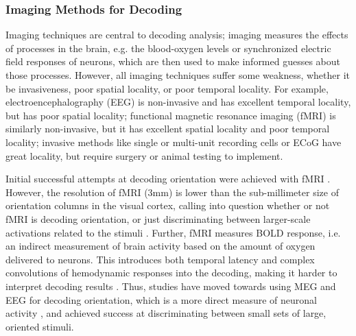 \documentclass[../main.tex]{subfiles}
\begin{document}
\subsubsection{Imaging Methods for Decoding}
Imaging techniques are central to decoding analysis; imaging measures the effects of processes in the brain, e.g. the blood-oxygen levels or synchronized electric field responses of neurons, which are then used to make informed guesses about those processes. However, all imaging techniques suffer some weakness, whether it be invasiveness, poor spatial locality, or poor temporal locality. For example, electroencephalography (EEG) is non-invasive and has excellent temporal locality, but has poor spatial locality; functional magnetic resonance imaging (fMRI) is similarly non-invasive, but it has excellent spatial locality and poor temporal locality; invasive methods like single or multi-unit recording cells or ECoG have great locality, but require surgery or animal testing to implement.

Initial successful attempts at decoding orientation were achieved with fMRI \citep{haynes_rees_2005, kamitani_tong_2005}. However, the resolution of fMRI (3mm) is lower than the sub-millimeter size of orientation columns in the visual cortex, calling into question whether or not fMRI is decoding orientation, or just discriminating between larger-scale activations related to the stimuli \citep{cichy_ramirez_pantazis_2015}. Further, fMRI measures BOLD response, i.e. an indirect measurement of brain activity based on the amount of oxygen delivered to neurons. This introduces both temporal latency and complex convolutions of hemodynamic responses into the decoding, making it harder to interpret decoding results \citep{cichy_ramirez_pantazis_2015}. Thus, studies have moved towards using MEG and EEG for decoding orientation, which is a more direct measure of neuronal activity \citep{cichy_ramirez_pantazis_2015, pantazis_fang_qin_mohsenzadeh_li_cichy_2018, GARCIA2013515}, and achieved success at discriminating between small sets of large, oriented stimuli.
\end{document}
